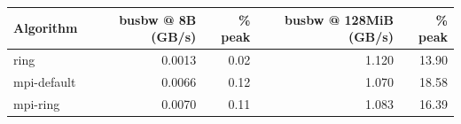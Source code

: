 \begin{tabular}{lrrrr}
\toprule
Algorithm & busbw @ 8B (GB/s) & \% peak & busbw @ 128MiB (GB/s) & \% peak \\
\midrule
ring & 0.0013 & 0.02 & 1.120 & 13.90 \\
mpi-default & 0.0066 & 0.12 & 1.070 & 18.58 \\
mpi-ring & 0.0070 & 0.11 & 1.083 & 16.39 \\
\bottomrule
\end{tabular}

